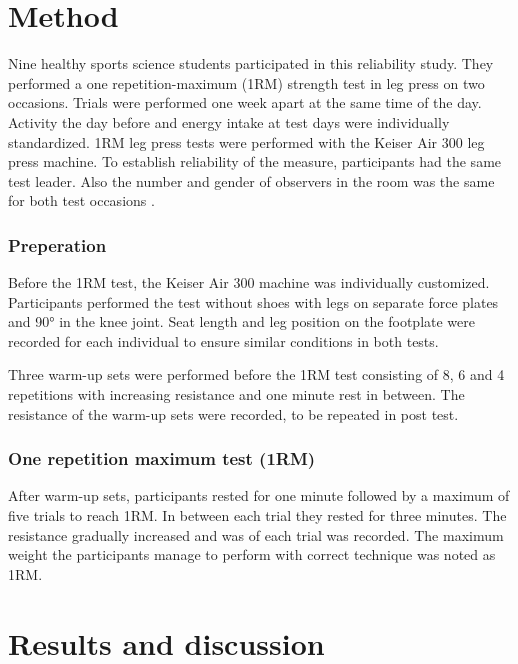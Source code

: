 \documentclass[
]{book}
\begin{document}
\hypertarget{method}{%
\section{Method}\label{method}}

Nine healthy sports science students participated in this reliability study. They performed a one repetition-maximum (1RM) strength test in leg press on two occasions. Trials were performed one week apart at the same time of the day. Activity the day before and energy intake at test days were individually standardized. 1RM leg press tests were performed with the Keiser Air 300 leg press machine. To establish reliability of the measure, participants had the same test leader. Also the number and gender of observers in the room was the same for both test occasions \citep{halperin2015}.

\hypertarget{preperation}{%
\subsubsection{Preperation}\label{preperation}}

Before the 1RM test, the Keiser Air 300 machine was individually customized. Participants performed the test without shoes with legs on separate force plates and 90° in the knee joint. Seat length and leg position on the footplate were recorded for each individual to ensure similar conditions in both tests.

Three warm-up sets were performed before the 1RM test consisting of 8, 6 and 4 repetitions with increasing resistance and one minute rest in between. The resistance of the warm-up sets were recorded, to be repeated in post test.

\hypertarget{one-repetition-maximum-test-1rm}{%
\subsubsection{One repetition maximum test (1RM)}\label{one-repetition-maximum-test-1rm}}

After warm-up sets, participants rested for one minute followed by a maximum of five trials to reach 1RM. In between each trial they rested for three minutes. The resistance gradually increased and was of each trial was recorded. The maximum weight the participants manage to perform with correct technique was noted as 1RM.

\hypertarget{results-and-discussion}{%
\section{Results and discussion}\label{results-and-discussion}}
\end{document}
